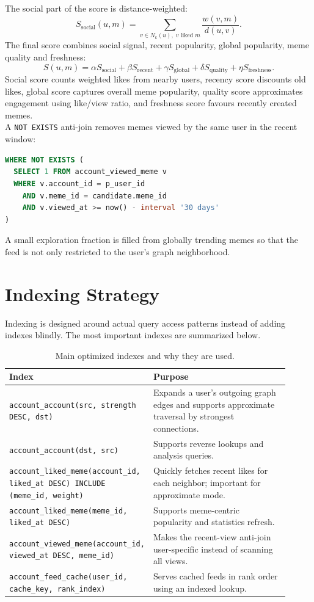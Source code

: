 \documentclass[11pt,a4paper]{article}
\begin{document}
The social part of the score is distance-weighted:
\[
S_{\mathrm{social}}(u,m) = \sum_{v \in N_k(u),\; v\text{ liked }m} \frac{w(v,m)}{d(u,v)}.
\]
The final score combines social signal, recent popularity, global popularity, meme quality and freshness:
\[
S(u,m)=\alpha S_{\mathrm{social}}+\beta S_{\mathrm{recent}}+\gamma S_{\mathrm{global}}+\delta S_{\mathrm{quality}}+\eta S_{\mathrm{freshness}}.
\]
Social score counts weighted likes from nearby users, recency score discounts old likes, global score captures overall meme popularity, quality score approximates engagement using like/view ratio, and freshness score favours recently created memes.\\
A \texttt{NOT EXISTS} anti-join removes memes viewed by the same user in the recent window:
\begin{lstlisting}[language=SQL]
WHERE NOT EXISTS (
  SELECT 1 FROM account_viewed_meme v
  WHERE v.account_id = p_user_id
    AND v.meme_id = candidate.meme_id
    AND v.viewed_at >= now() - interval '30 days'
)
\end{lstlisting}
A small exploration fraction is filled from globally trending memes so that the feed is not only restricted to the user's graph neighborhood.

\section{Indexing Strategy}
Indexing is designed around actual query access patterns instead of adding indexes blindly. The most important indexes are summarized below.

\begin{table}[H]
\centering
\caption{Main optimized indexes and why they are used.}
\begin{tabular}{p{0.36\linewidth}p{0.55\linewidth}}
\toprule
Index & Purpose \\
\midrule
\texttt{account\_account(src, strength DESC, dst)} & Expands a user's outgoing graph edges and supports approximate traversal by strongest connections. \\
\texttt{account\_account(dst, src)} & Supports reverse lookups and analysis queries. \\
\texttt{account\_liked\_meme(account\_id, liked\_at DESC) INCLUDE (meme\_id, weight)} & Quickly fetches recent likes for each neighbor; important for approximate mode. \\
\texttt{account\_liked\_meme(meme\_id, liked\_at DESC)} & Supports meme-centric popularity and statistics refresh. \\
\texttt{account\_viewed\_meme(account\_id, viewed\_at DESC, meme\_id)} & Makes the recent-view anti-join user-specific instead of scanning all views. \\
\texttt{account\_feed\_cache(user\_id, cache\_key, rank\_index)} & Serves cached feeds in rank order using an indexed lookup. \\
\bottomrule
\end{tabular}
\end{table}
\end{document}
